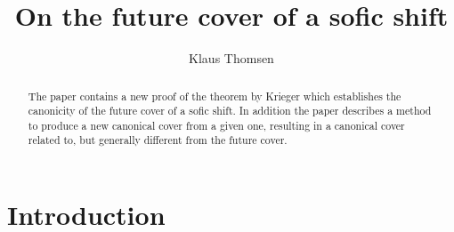 \documentclass[12pt,oneside,english]{amsart}
\title{On the future cover of a sofic shift}
\author{Klaus Thomsen}
\begin{document}
\begin{abstract} The paper contains a new proof of the theorem by Krieger which establishes the canonicity of the future cover of a sofic shift. In addition the paper describes a method to produce a new canonical cover from a given one, resulting in a canonical cover related to, but generally different from the future cover.
\end{abstract}
\maketitle\thispagestyle{empty}


\section{Introduction}
 
\end{document}

